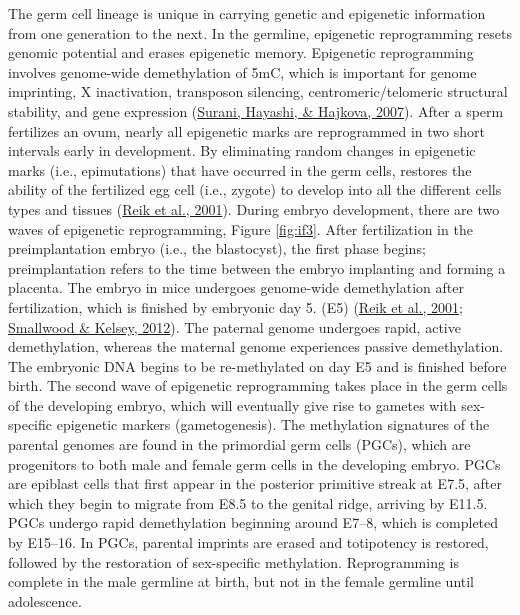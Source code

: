 \documentclass[12pt,twoside]{reedthesis}
\begin{document}
The germ cell lineage is unique in carrying genetic and epigenetic
information from one generation to the next. In the germline, epigenetic
reprogramming resets genomic potential and erases epigenetic memory.
Epigenetic reprogramming involves genome-wide demethylation of 5mC,
which is important for genome imprinting, X inactivation, transposon
silencing, centromeric/telomeric structural stability, and gene
expression (\protect\hyperlink{ref-surani2007}{Surani, Hayashi, \& Hajkova, 2007}). After a sperm fertilizes an ovum, nearly all
epigenetic marks are reprogrammed in two short intervals early in
development. By eliminating random changes in epigenetic marks (i.e.,
epimutations) that have occurred in the germ cells, restores the ability
of the fertilized egg cell (i.e., zygote) to develop into all the
different cells types and tissues (\protect\hyperlink{ref-reik2001}{Reik et al., 2001}). During embryo
development, there are two waves of epigenetic reprogramming, Figure \ref{fig:if3}.
After fertilization in the preimplantation embryo (i.e., the
blastocyst), the first phase begins; preimplantation refers to the time
between the embryo implanting and forming a placenta. The embryo in mice
undergoes genome-wide demethylation after fertilization, which is
finished by embryonic day 5. (E5) (\protect\hyperlink{ref-reik2001}{Reik et al., 2001}; \protect\hyperlink{ref-smallwood2012}{Smallwood \& Kelsey, 2012}). The
paternal genome undergoes rapid, active demethylation, whereas the
maternal genome experiences passive demethylation. The embryonic DNA
begins to be re-methylated on day E5 and is finished before birth. The
second wave of epigenetic reprogramming takes place in the germ cells of
the developing embryo, which will eventually give rise to gametes with
sex-specific epigenetic markers (gametogenesis). The methylation
signatures of the parental genomes are found in the primordial germ
cells (PGCs), which are progenitors to both male and female germ cells
in the developing embryo. PGCs are epiblast cells that first appear in
the posterior primitive streak at E7.5, after which they begin to
migrate from E8.5 to the genital ridge, arriving by E11.5. PGCs undergo
rapid demethylation beginning around E7--8, which is completed by
E15--16. In PGCs, parental imprints are erased and totipotency is
restored, followed by the restoration of sex-specific methylation.
Reprogramming is complete in the male germline at birth, but not in the
female germline until adolescence.
\end{document}
